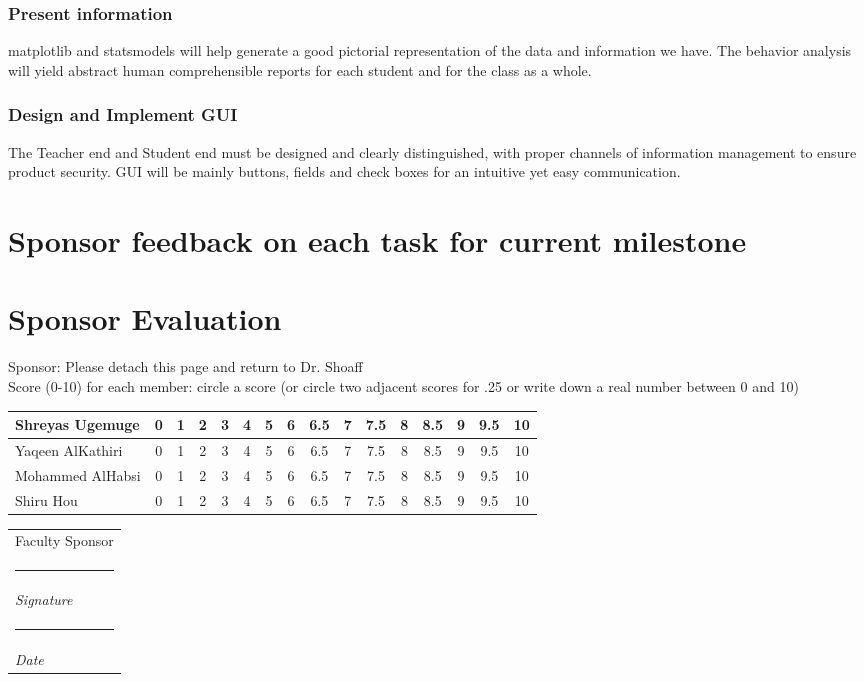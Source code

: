 \documentclass[12pt]{article}
\makeatletter
\newcommand{\namesigdate}[2][5cm]{%
  \begin{tabular}{@{}p{#1}@{}}
    #2 \\[2\normalbaselineskip] \hrule \\[0pt]
    {\small \textit{Signature}} \\ [2\normalbaselineskip] \hrule \\[0pt]
    {\small \textit{Date}}
  \end{tabular}
}
\makeatother
\begin{document}
	\subsubsection{Present information}
	matplotlib and statsmodels will help generate a good pictorial representation of the data and information we have. The behavior analysis will yield abstract human comprehensible reports for each student and for the class as a whole. 
	\subsubsection{Design and Implement GUI}
	The Teacher end and Student end must be designed and clearly distinguished, with proper channels of information management to ensure product security. GUI will be mainly buttons, fields and check boxes for an intuitive yet easy communication.

	\pagebreak
	\section{Sponsor feedback on each task for current milestone}
	\pagebreak
	\section{Sponsor Evaluation}
	Sponsor: Please detach this page and return to Dr. Shoaff \\ \hfill \break 
	Score (0-10) for each member: circle a score (or circle two adjacent scores for .25 or write down a real number between 0 and 10) \\ \hfill \break
	\begin{tabularx}{\textwidth}{|X|c|c|c|c|c|c|c|c|c|c|c|c|c|c|c|}
	\hline
	Shreyas Ugemuge & 0 & 1 &  2 & 3 & 4 & 5 & 6 & 6.5 & 7 & 7.5 & 8 & 8.5 & 9 & 9.5 & 10 \\ \hline
	Yaqeen AlKathiri & 0 & 1 &  2 & 3 & 4 & 5 & 6 & 6.5 & 7 & 7.5 & 8 & 8.5 & 9 & 9.5 & 10 \\ \hline
	Mohammed AlHabsi & 0 & 1 &  2 & 3 & 4 & 5 & 6 & 6.5 & 7 & 7.5 & 8 & 8.5 & 9 & 9.5 & 10 \\ \hline
	Shiru Hou & 0 & 1 &  2 & 3 & 4 & 5 & 6 & 6.5 & 7 & 7.5 & 8 & 8.5 & 9 & 9.5 & 10 \\ 
	\hline 
	\end{tabularx}
	\hfil \break
	\hfil \break
	\namesigdate{Faculty Sponsor}
	
\end{document}
